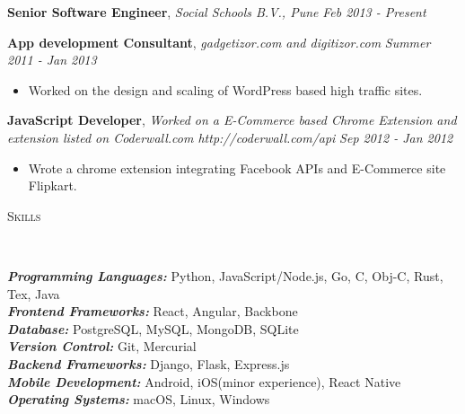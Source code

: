 \documentclass[9pt]{article}
\newenvironment{changemargin}[2]{%
  \begin{list}{}{%
    \setlength{\topsep}{0pt}%
    \setlength{\leftmargin}{#1}%
    \setlength{\rightmargin}{#2}%
    \setlength{\listparindent}{\parindent}%
    \setlength{\itemindent}{\parindent}%
    \setlength{\parsep}{\parskip}%
  }%
  \item[]}{\end{list}
}
\newcommand{\lineover}{
    \begin{changemargin}{-0.05in}{-0.05in}
        \vspace*{-8pt}
        \hrulefill \\
        \vspace*{-2pt}
    \end{changemargin}
}
\newcommand{\header}[1]{
    \begin{changemargin}{-0.5in}{-0.5in}
        \scshape{#1}\\
    \lineover
    \end{changemargin}
}
\newenvironment{body} {
    \vspace*{-16pt}
    \begin{changemargin}{-0.25in}{-0.5in}
  }
    {\end{changemargin}
}
\begin{document}
\begin{body}
    \vspace{14pt}
    \textbf{Senior Software Engineer}, \emph{Social Schools B.V., Pune} \hfill \emph{Feb 2013 - Present}\\
    \vspace*{-4pt}

    \vspace{14pt}
    \textbf{App development Consultant}, \emph{gadgetizor.com and digitizor.com} \hfill \emph{Summer 2011 - Jan 2013}\\
    \vspace*{-4pt}
    \begin{itemize} \itemsep -0pt  %
        \item Worked on the design and scaling of WordPress based high traffic sites.
    \end{itemize}

    \textbf {JavaScript Developer}, \emph{Worked on a E-Commerce based Chrome Extension and extension listed on Coderwall.com http://coderwall.com/api} \hfill \emph{Sep 2012 - Jan 2012}\\
    \vspace*{-4pt}
    \begin{itemize} \itemsep -0pt
        \item Wrote a chrome extension integrating Facebook APIs and E-Commerce site Flipkart.
    \end{itemize}
\end{body}

\smallskip


\header{Skills}

\begin{body}
    \vspace{14pt}
    \emph{\textbf{Programming Languages:}}{} Python, JavaScript/Node.js, Go, C, Obj-C, Rust, Tex, Java\\
    \emph{\textbf{Frontend Frameworks:}}{} React, Angular, Backbone\\
    \emph{\textbf{Database:}}{} PostgreSQL, MySQL, MongoDB, SQLite\\
    \emph{\textbf{Version Control:}}{} Git, Mercurial\\
    \emph{\textbf{Backend Frameworks:}}{} Django, Flask, Express.js\\
    \emph{\textbf{Mobile Development:}}{} Android, iOS(minor experience), React Native\\
    \emph{\textbf{Operating Systems:}}{} macOS, Linux, Windows\\
\end{body}
\end{document}
